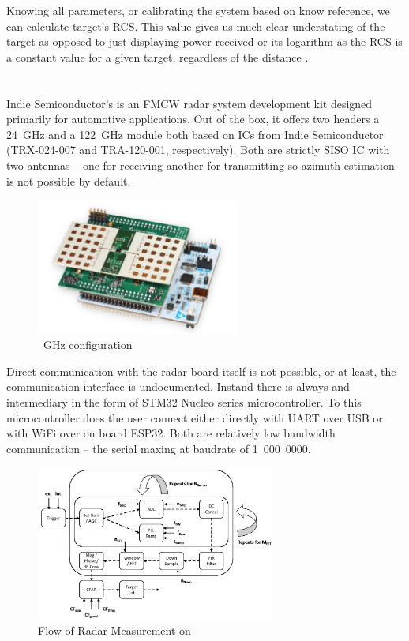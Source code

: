 Knowing all parameters, or calibrating the system based on know reference, we can  calculate target's RCS.
This value gives us much clear understating of the target as opposed to just displaying power received or its logarithm as the RCS is a constant value for a given target, regardless of the distance \cite{richards2022}.

\chapter{\sidar}

Indie Semiconductor's \sidar is an FMCW radar system development kit designed primarily for automotive applications.
Out of the box, it offers two headers a 24~GHz and a 122~GHz module both based on ICs from Indie Semiconductor (TRX-024-007 and TRA-120-001, respectively).
Both are strictly SISO IC with two antennas -- one for receiving another for transmitting so azimuth estimation is not possible by default.

\begin{figure}[h!]
  \centering
  \includegraphics[width=0.6\textwidth]{../img/sidar.png}

  \caption[\sidar \cite{sidarMANOld}]{~GHz configuration}
  \label{fig:sidar}
\end{figure}

Direct communication with the radar board itself is not possible, or at least, the communication interface is undocumented.
Instand there is always and intermediary in the form of  STM32 Nucleo series microcontroller.
To this microcontroller does the user connect either directly with UART over USB or with WiFi over on board ESP32.
Both are relatively low bandwidth communication -- the serial maxing at baudrate of 1~000~0000.

\begin{figure}[h!]
  \centering
  \includegraphics[width=0.7\textwidth]{../img/sidar_flow.png}
  \caption[Flow of Radar Measurement on \sidar \cite{sidarPRO}]{Flow of Radar Measurement on \sidar}
  \label{fig:sidarFlow}
\end{figure}

